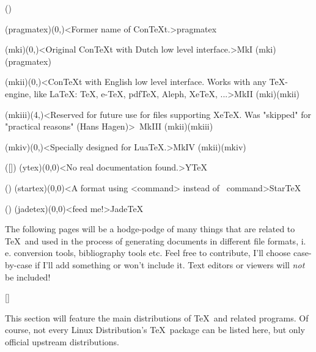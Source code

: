 \documentclass[
%
]{scrartcl}
\begin{document}
\clearpage
\tograph*(){
	\tonode(pragmatex)(0,\layer)<Former name of ConTeXt.>{pragmatex}
	\steplayer[-2]

	\tonode(mki)(0,\layer)<Original ConTeXt with Dutch low level interface.>{\ConTeXt MkI}
	\todraw(mki)(pragmatex)
	\steplayer[-2]

	\tonode[\vip](mkii)(0,\layer)<ConTeXt with English low level interface. Works with any TeX-engine, like LaTeX: TeX, e-TeX, pdfTeX, Aleph, XeTeX, ...>{\ConTeXt MkII}
	\todraw(mki)(mkii)
	\steplayer[-2]
	
	\tonode(mkiii)(4,\layer)<Reserved for future use for files supporting XeTeX. Was "skipped" for "practical reasons" (Hans Hagen)>{\ConTeXt\ MkIII}
	\todraw(mkii)(mkiii)
	\steplayer[-2]
	
	\tonode[\vip](mkiv)(0,\layer)<Specially designed for LuaTeX.>{\ConTeXt MkIV}
	\todraw*(mkii)(mkiv)
}

\clearpage
\tograph([\experimental]){
	\tonode(ytex)(0,0)<No real documentation found.>{Y\TeX}
}

\tograph(){
	\tonode(startex)(0,0)<A format using <command> instead of \ command>{Star\TeX}
}

\tograph(){
	\tonode(jadetex)(0,0)<feed me!>{Jade\TeX}
}

\clearpage

\parbox{\textwidth}{\normalsize
The following pages will be a hodge-podge of many things that are related to \TeX\ and used in the process of generating documents in different file formats, i.\,e. conversion tools, bibliography tools etc. Feel free to contribute, I'll choose case-by-case if I'll add something or won't include it. Text editors or viewers will \emph{not} be included!
}

[\distro]
\parbox{\textwidth}{\normalsize
This section will feature the main distributions of \TeX\ and related programs. Of course, not every Linux Distribution's \TeX\ package can be listed here, but only official upstream distributions.
}
\end{document}
